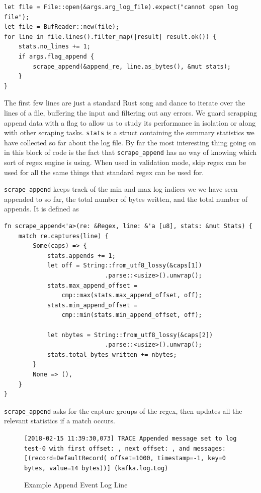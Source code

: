 \begin{verbatim}
let file = File::open(&args.arg_log_file).expect("cannot open log file");
let file = BufReader::new(file);
for line in file.lines().filter_map(|result| result.ok()) {
    stats.no_lines += 1;
    if args.flag_append {
        scrape_append(&append_re, line.as_bytes(), &mut stats);
    }
} 
\end{verbatim}

The first few lines are just a standard Rust song and dance to
iterate over the lines of a file, buffering the input and filtering
out any errors. We guard scrapping append data with a flag to allow
us to study its performance in isolation or along with other
scraping tasks. \verb'stats' is a struct containing the summary
statistics we have collected so far about the log file. By far
the most interesting thing going on in this block of code is
the fact that \verb'scrape_append' has no way of knowing which
sort of regex engine is using. When used in validation mode,
skip regex can be used for all the same things that standard
regex can be used for.

\verb'scrape_append' keeps track of the min and max log
indices we we have seen appended to so far, the total
number of bytes written, and the total number of appends.
It is defined as

\begin{verbatim}
fn scrape_append<'a>(re: &Regex, line: &'a [u8], stats: &mut Stats) {
    match re.captures(line) {
        Some(caps) => {
            stats.appends += 1;
            let off = String::from_utf8_lossy(&caps[1])
                            .parse::<usize>().unwrap();
            stats.max_append_offset =
                cmp::max(stats.max_append_offset, off);
            stats.min_append_offset =
                cmp::min(stats.min_append_offset, off);

            let nbytes = String::from_utf8_lossy(&caps[2])
                            .parse::<usize>().unwrap();
            stats.total_bytes_written += nbytes;
        }
        None => (),
    }
}
\end{verbatim}

\verb'scrape_append' asks for the capture groups of the regex,
then updates all the relevant statistics if a match occurs.

\begin{figure}
\caption{Example Append Event Log Line}
\label{fig:appendevent}

\texttt{[2018-02-15 11:39:30,073] \allowbreak TRACE Appended \allowbreak
message set \allowbreak to log \allowbreak test-0 with \allowbreak
first offset: , next offset: , and
messages: [(record=\allowbreak DefaultRecord(\allowbreak
offset=1000, \allowbreak timestamp=-1, \allowbreak key=0 bytes,
 value=14 \allowbreak bytes))] \allowbreak(kafka.log.Log)
}
\end{figure}

